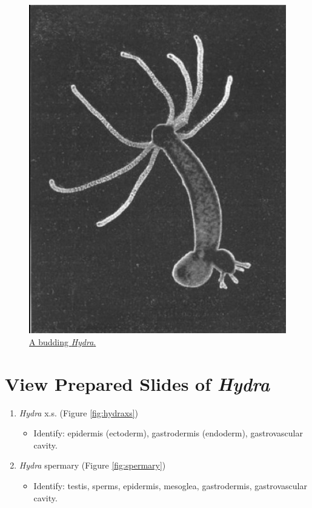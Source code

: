 \begin{figure}

{\centering \includegraphics[width=0.7\linewidth]{./figures/porifera/hydra}

}

\caption{\href{https://en.wikipedia.org/wiki/Hydra_(genus)\#/media/File:Hydra-Foto.jpg}{A
budding \emph{Hydra}.}}\label{fig:hydra}
\end{figure}

\section{\texorpdfstring{View Prepared Slides of
\emph{Hydra}}{View Prepared Slides of Hydra}}\label{view-prepared-slides-of-hydra}

\begin{enumerate}
\def\labelenumi{\arabic{enumi}.}
\tightlist
\item
  \emph{Hydra} x.s. (Figure \ref{fig:hydraxs})

  \begin{itemize}
  \tightlist
  \item
    Identify: epidermis (ectoderm), gastrodermis (endoderm),
    gastrovascular cavity.
  \end{itemize}
\item
  \emph{Hydra} spermary (Figure \ref{fig:spermary})

  \begin{itemize}
  \tightlist
  \item
    Identify: testis, sperms, epidermis, mesoglea, gastrodermis,
    gastrovascular cavity.
  \end{itemize}
\end{enumerate}

